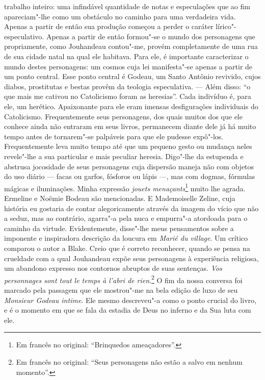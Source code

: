 trabalho inteiro: uma infindável quantidade de notas e especulações que
ao fim apareciam"-lhe como um obstáculo no caminho para uma verdadeira
vida. Apenas a partir de então sua produção começou a perder o caráter
lírico"-especulativo. Apenas a partir de então formou"-se o mundo dos
personagens que propriamente, como Jouhandeau contou"-me, provém
completamente de uma rua de sua cidade natal na qual ele habitava. Para
ele, é importante caracterizar o mundo destes personagens: um cosmos
cuja lei manifesta"-se apenas a partir de um ponto central. Esse ponto
central é Godeau, um Santo Antônio revivido, cujos diabos, prostitutas e
bestas provêm da teologia especulativa. --- Além disso: ``o que mais me
cativou no Catolicismo foram as heresias''. Cada indivíduo é, para ele,
um herético. Apaixonante para ele eram imensas desfigurações individuais
do Catolicismo. Frequentemente seus personagens, dos quais muitos dos
que ele conhece ainda não entraram em seus livros, permanecem diante
dele já há muito tempo antes de tornarem"-se palpáveis para que ele
pudesse expô"-los. Frequentemente leva muito tempo até que um pequeno
gesto ou mudança neles revele"-lhe a sua particular e mais peculiar
heresia. Digo"-lhe da estupenda e abstrusa jocosidade de seus personagens
cuja dispersão maneja não com objetos do uso diário --- facas ou garfos,
fósforos ou lápis ---, mas com dogmas, fórmulas mágicas e iluminações.
Minha expressão \emph{jouets menaçants}\footnote{Em francês no original: ``Brinquedos
  ameaçadores''. \versal{[N. T.]}} muito lhe agrada. Ermeline e
Noëmie Bodeau são mencionadas. E Mademoiselle Zeline, cuja história eu
gostaria de contar alegoricamente através da imagem do vício que não a
seduz, mas ao contrário, agarra"-a pela nuca e empurra"-a atordoada para o
caminho da virtude. Evidentemente, disse"-lhe meus pensamentos sobre a
imponente e inspiradora descrição da loucura em \emph{Marié du village}.
Um crítico comparou o autor a Blake. Creio que é correto reconhecer,
quando se pensa na crueldade com a qual Jouhandeau expõe seus
personagens à experiência religiosa, um abandono expresso nos contornos
abruptos de suas sentenças. \emph{Vos personnages sont tout le temps à
l'abri de rien}.\footnote{Em francês no original: ``Seus personagens não estão a salvo em
  nenhum momento''. \versal{[N. T.]}} O fim da nossa conversa
foi marcado pela passagem que ele mostrou"-me na bela edição de luxo de
seu \emph{Monsieur Godeau intime}. Ele mesmo descreveu"-a como o ponto
crucial do livro, e é o momento em que se fala da estadia de Deus no
inferno e da Sua luta com ele.

